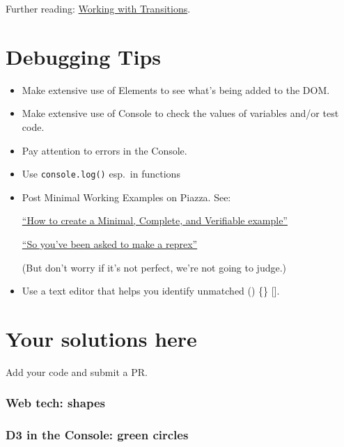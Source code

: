 \documentclass[openany]{book}
\begin{document}
Further reading: \href{https://bost.ocks.org/mike/transition/}{Working with Transitions}.

\hypertarget{debugging-tips}{%
\chapter{Debugging Tips }\label{debugging-tips}}

\begin{itemize}
\item
  Make extensive use of Elements to see what's being added to the DOM.
\item
  Make extensive use of Console to check the values of variables and/or test code.
\item
  Pay attention to errors in the Console.
\item
  Use \texttt{console.log()} esp.~in functions
\item
  Post Minimal Working Examples on Piazza. See:

  \href{https://stackoverflow.com/help/mcve}{``How to create a Minimal, Complete, and Verifiable example''}

  \href{https://www.jessemaegan.com/post/so-you-ve-been-asked-to-make-a-reprex/}{``So you've been asked to make a reprex''}

  (But don't worry if it's not perfect, we're not going to judge.)
\item
  Use a text editor that helps you identify unmatched () \{\} {[}{]}.
\end{itemize}

\hypertarget{your-solutions-here}{%
\chapter{Your solutions here }\label{your-solutions-here}}

Add your code and submit a PR.

\hypertarget{web-tech-shapes}{%
\subsection*{Web tech: shapes}\label{web-tech-shapes}}

\hypertarget{d3-in-the-console-green-circles}{%
\subsection*{D3 in the Console: green circles}\label{d3-in-the-console-green-circles}}
\end{document}

